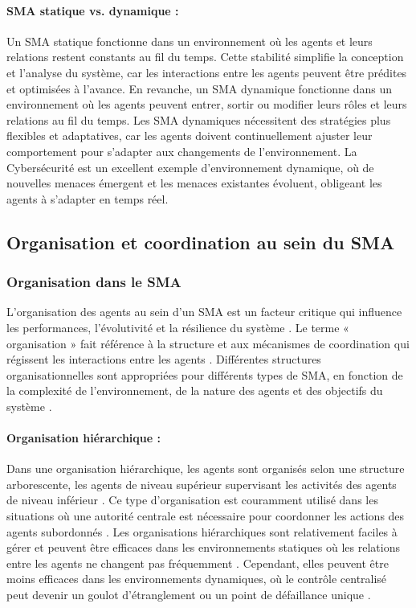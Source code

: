 \paragraph{SMA statique vs. dynamique :}
Un SMA statique fonctionne dans un environnement où les agents et leurs relations restent constants au fil du temps. Cette stabilité simplifie la conception et l'analyse du système, car les interactions entre les agents peuvent être prédites et optimisées à l'avance. En revanche, un SMA dynamique fonctionne dans un environnement où les agents peuvent entrer, sortir ou modifier leurs rôles et leurs relations au fil du temps. Les SMA dynamiques nécessitent des stratégies plus flexibles et adaptatives, car les agents doivent continuellement ajuster leur comportement pour s'adapter aux changements de l'environnement. La Cybersécurité est un excellent exemple d'environnement dynamique, où de nouvelles menaces émergent et les menaces existantes évoluent, obligeant les agents à s'adapter en temps réel.

\subsection{Organisation et coordination au sein du SMA}

\subsubsection{Organisation dans le SMA}

L'organisation des agents au sein d'un SMA est un facteur critique qui influence les performances, l'évolutivité et la résilience du système \cite{wooldridge2009introduction}. Le terme « organisation » fait référence à la structure et aux mécanismes de coordination qui régissent les interactions entre les agents \cite{weiss1999multiagent}. Différentes structures organisationnelles sont appropriées pour différents types de SMA, en fonction de la complexité de l'environnement, de la nature des agents et des objectifs du système \cite{durfee1999distributed}.

\paragraph{Organisation hiérarchique :}
Dans une organisation hiérarchique, les agents sont organisés selon une structure arborescente, les agents de niveau supérieur supervisant les activités des agents de niveau inférieur \cite{wooldridge2009introduction}. Ce type d'organisation est couramment utilisé dans les situations où une autorité centrale est nécessaire pour coordonner les actions des agents subordonnés \cite{durfee1999distributed}. Les organisations hiérarchiques sont relativement faciles à gérer et peuvent être efficaces dans les environnements statiques où les relations entre les agents ne changent pas fréquemment \cite{weiss1999multiagent}. Cependant, elles peuvent être moins efficaces dans les environnements dynamiques, où le contrôle centralisé peut devenir un goulot d'étranglement ou un point de défaillance unique \cite{durfee1999distributed}.

